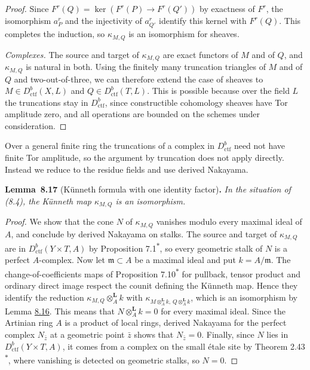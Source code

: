 \documentclass[11pt]{article}
\newenvironment{bpstatement}[2]{\par\addvspace{0.6\baselineskip}\noindent\textbf{#1}#2\textbf{.}\enspace\ignorespaces}
  {\par\addvspace{0.4\baselineskip}}
\newenvironment{bpstatementit}[2]{\begin{bpstatement}{#1}{#2}\itshape\ignorespaces}{\end{bpstatement}}
\newcommand{\bpout}[1]{#1\textsuperscript{\hyperlink{bp-outside}{\ensuremath{\ast}}}}
\begin{document}
\begin{proof}[{Proof}]
Since \(F^r(Q)=\ker(F^r(P)\to F^r(Q'))\) by exactness of \(F^r\), the isomorphism \(a_P^r\) and the injectivity of \(a_{Q'}^r\) identify this kernel with \(F^r(Q)\). This completes the induction, so \(\kappa_{M,Q}\) is an isomorphism for sheaves.

\emph{Complexes.} The source and target of \(\kappa_{M,Q}\) are exact functors of \(M\) and of \(Q\), and \(\kappa_{M,Q}\) is natural in both. Using the finitely many truncation triangles of \(M\) and of \(Q\) and two-out-of-three, we can therefore extend the case of sheaves to \(M\in D^b_{\mathrm{ctf}}(X,L)\) and \(Q\in D^b_{\mathrm{ctf}}(T,L)\). This is possible because over the field \(L\) the truncations stay in \(D^b_{\mathrm{ctf}}\), since constructible cohomology sheaves have Tor amplitude zero, and all operations are bounded on the schemes under consideration.
\end{proof}

\label{bp61}%
Over a general finite ring the truncations of a complex in \(D^b_{\mathrm{ctf}}\) need not have finite Tor amplitude, so the argument by truncation does not apply directly. Instead we reduce to the residue fields and use derived Nakayama.

\label{bp62}%
\begin{bpstatementit}{Lemma~8.17}{ (Künneth formula with one identity factor)}
In the situation of (8.4), the Künneth map \(\kappa_{M,Q}\) is an isomorphism.
\end{bpstatementit}

\begin{proof}[{Proof}]\label{bp63}%
We show that the cone \(N\) of \(\kappa_{M,Q}\) vanishes modulo every maximal ideal of \(A\), and conclude by derived Nakayama on stalks. The source and target of \(\kappa_{M,Q}\) are in \(D^b_{\mathrm{ctf}}(Y\times T,A)\) by Proposition \bpout{7.1}, so every geometric stalk of \(N\) is a perfect \(A\)-complex. Now let \(\mathfrak m\subset A\) be a maximal ideal and put \(k=A/\mathfrak m\). The change-of-coefficients maps of Proposition \bpout{7.10} for pullback, tensor product and ordinary direct image respect the counit defining the Künneth map. Hence they identify the reduction \(\kappa_{M,Q}\otimes^{\mathbf L}_A k\) with \(\kappa_{M\otimes^{\mathbf L}_Ak,\,Q\otimes^{\mathbf L}_Ak}\), which is an isomorphism by Lemma \hyperref[bp59]{8.16}. This means that \(N\otimes^{\mathbf L}_A k=0\) for every maximal ideal. Since the Artinian ring \(A\) is a product of local rings, derived Nakayama for the perfect complex \(N_{\bar z}\) at a geometric point \(\bar z\) shows that \(N_{\bar z}=0\). Finally, since \(N\) lies in \(D^b_{\mathrm{ctf}}(Y\times T,A)\), it comes from a complex on the small étale site by Theorem \bpout{2.43}, where vanishing is detected on geometric stalks, so \(N=0\).
\end{proof}
\end{document}
